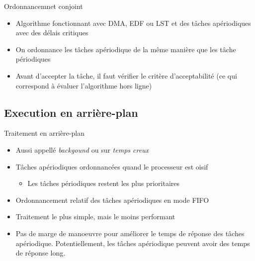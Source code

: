 \begin{frame}{Ordonnancemnet conjoint}
  \begin{itemize} 
  \item  Algorithme fonctionnant  avec DMA,  EDF ou  LST et  des tâches
    apériodiques avec des délais critiques
  \item On  ordonnance les tâches  apériodique de la même  manière que
    les tâche périodiques
  \item  Avant  d'accepter  la  tâche,  il faut  vérifier  le  critère
    d'acceptabilité (ce qui correspond à évaluer l'algorithme hors ligne)
  \end{itemize} 
\end{frame} 


\subsection{Execution en arrière-plan}

\begin{frame}{Traitement en arrière-plan} 
  \begin{itemize}
  \item Aussi appellé \emph{backgound} ou sur \emph{temps creux}
  \item Tâches apériodiques ordonnancées quand le processeur est oisif 
    \begin{itemize}
    \item Les tâches périodiques restent les plus prioritaires 
    \end{itemize}
  \item Ordonnancement relatif des tâches apériodiques en mode FIFO 
  \item Traitement le plus simple, mais le moins performant 
  \item Pas de  marge de manoeuvre pour améliorer  le temps de réponse
    des  tâches apériodique.  Potentiellement, les  tâches apériodique
    peuvent avoir des temps de réponse long.
  \end{itemize}
\end{frame}

